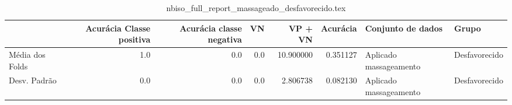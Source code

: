 \begin{table}
\centering
\caption{nbiso_full_report_massageado_desfavorecido.tex}
\label{nbiso_full_report_massageado_desfavorecido.tex}
\begin{tabular}{lrrrrrll}
\toprule
{} &  Acurácia Classe positiva &  Acurácia classe negativa &  VN  &   VP + VN  &  Acurácia &       Conjunto de dados &          Grupo \\
\midrule
Média dos Folds &                       1.0 &                       0.0 &  0.0 &  10.900000 &  0.351127 &  Aplicado massageamento &  Desfavorecido \\
Desv. Padrão    &                       0.0 &                       0.0 &  0.0 &   2.806738 &  0.082130 &  Aplicado massageamento &  Desfavorecido \\
\bottomrule
\end{tabular}
\end{table}
